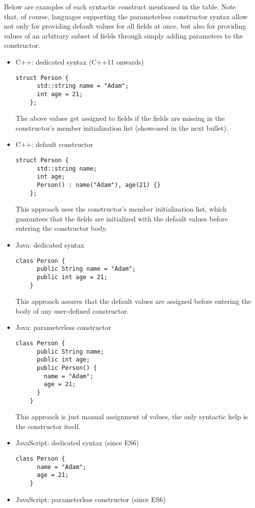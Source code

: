 \documentclass[en]{pracamgr}
\begin{document}
Below are examples of each syntactic construct mentioned in the table. 
Note that, of course, languages supporting the parameterless constructor syntax allow not only for providing default values for all 
fields at once, but also for providing values of an arbitrary subset of fields through simply adding parameters to the constructor.
\begin{itemize}
  \item C++: dedicated syntax (C++11 onwards) \cite{Cpp11}
  \begin{lstlisting}[style=cpp]
    struct Person {
      std::string name = "Adam";
      int age = 21;
    };
  \end{lstlisting}
  The above values get assigned to fields if the fields are missing in the 
  constructor's member initialization list (showcased in the next bullet).
  \item C++: default constructor \cite{Cpp98}
  \begin{lstlisting}[style=cpp]
    struct Person {
      std::string name;
      int age;
      Person() : name("Adam"), age(21) {}
    };
  \end{lstlisting}
  This approach uses the constructor's member initialization list, which guarantees that the fields are initialized
  with the default values before entering the constructor body.
  \item Java: dedicated syntax
  \begin{lstlisting}[style=Java]
    class Person {
      public String name = "Adam";
      public int age = 21;
    }
  \end{lstlisting}
  This approach assures that the default values are assigned before entering the body of any user-defined constructor.
  \item Java: parameterless constructor
  \begin{lstlisting}[style=Java]
    class Person {
      public String name;
      public int age;
      public Person() {
        name = "Adam";
        age = 21;
      }
    }
  \end{lstlisting}
  This approach is just manual assignment of values, the only syntactic help is the constructor itself.
  \item JavaScript: dedicated syntax (since ES6)
  \begin{lstlisting}[style=JavaScript]
    class Person {
      name = "Adam";
      age = 21;
    }
  \end{lstlisting}
  \item JavaScript: parameterless constructor (since ES6)

\end{itemize}
\end{document}
